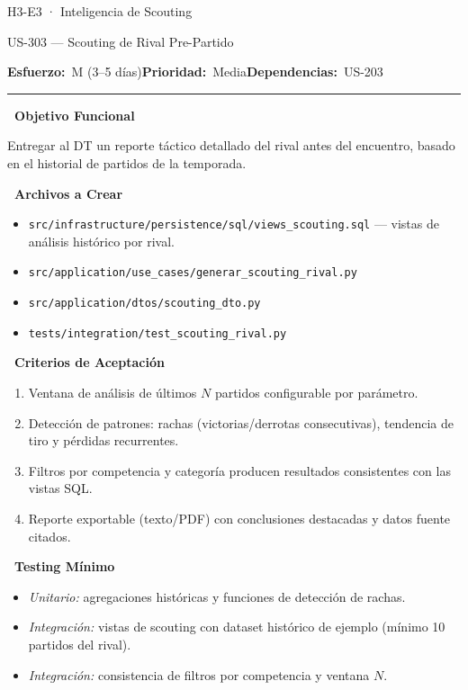 \documentclass[11pt,a4paper]{article}
\newcommand{\fpath}[1]{\texttt{\small #1}}
\newcommand{\usfield}[2][\;]{%
  \par\vspace{5pt}%
  {\small\textbf{\textcolor{primary}{#2}}}\par\vspace{2pt}%
}
\newcommand{\usmeta}[3]{%
  \vspace{2pt}%
  {\small\textcolor{secondary}{%
    \textbf{Esfuerzo:}~#1\quad\textbf{Prioridad:}~#2\quad\textbf{Dependencias:}~#3%
  }}%
  \par\vspace{4pt}%
  \textcolor{bordergray}{\rule{\linewidth}{0.4pt}}\par\vspace{4pt}%
}
\begin{document}
\begin{epicbox}{H3-E3 · Inteligencia de Scouting}
\end{epicbox}

\begin{uscard}{US-303 — Scouting de Rival Pre-Partido}

\usmeta{M (3–5 días)}{Media}{US-203}

\usfield{\faAlignLeft\ Objetivo Funcional}
Entregar al DT un reporte táctico detallado del rival antes del encuentro, basado en el historial de partidos de la temporada.

\usfield{\faFolderOpen\ Archivos a Crear}
\begin{itemize}[nosep, leftmargin=1.6em]
  \item \fpath{src/infrastructure/persistence/sql/views\_scouting.sql} — vistas de análisis histórico por rival.
  \item \fpath{src/application/use\_cases/generar\_scouting\_rival.py}
  \item \fpath{src/application/dtos/scouting\_dto.py}
  \item \fpath{tests/integration/test\_scouting\_rival.py}
\end{itemize}

\usfield{\faCheckCircle\ Criterios de Aceptación}
\begin{enumerate}[label=\textcolor{accent}{\textbf{AC\arabic*.}}, nosep, leftmargin=2.2em]
  \item Ventana de análisis de últimos $N$ partidos configurable por parámetro.
  \item Detección de patrones: rachas (victorias/derrotas consecutivas), tendencia de tiro y pérdidas recurrentes.
  \item Filtros por competencia y categoría producen resultados consistentes con las vistas SQL.
  \item Reporte exportable (texto/PDF) con conclusiones destacadas y datos fuente citados.
\end{enumerate}

\usfield{\faFlask\ Testing Mínimo}
\begin{itemize}[nosep, leftmargin=1.6em]
  \item \textit{Unitario:} agregaciones históricas y funciones de detección de rachas.
  \item \textit{Integración:} vistas de scouting con dataset histórico de ejemplo (mínimo 10 partidos del rival).
  \item \textit{Integración:} consistencia de filtros por competencia y ventana $N$.
\end{itemize}

\end{uscard}
\end{document}
